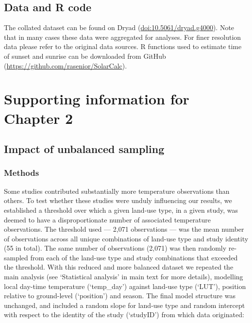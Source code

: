 \documentclass[12pt,a4paper,]{report}
\theoremstyle{definition}
\theoremstyle{definition}
\theoremstyle{definition}
\theoremstyle{remark}
\begin{document}
\section{Data and R code}\label{data-and-r-code}

The collated dataset can be found on Dryad
(\url{doi:10.5061/dryad.g4000}). Note that in many cases these data were
aggregated for analyses. For finer resolution data please refer to the
original data sources. R functions used to estimate time of sunset and
sunrise can be downloaded from GitHub
(\url{https://github.com/rasenior/SolarCalc}).

\clearpage
\appendix
{} \addappheadtotoc
\setcounter{figure}{0} \makeatletter 
\renewcommand{\thefigure}{A1.\@arabic\c@figure} \makeatother

\chapter{Supporting information for Chapter
2}\label{supporting-information-for-chapter-2}

\section{Impact of unbalanced sampling}\label{text-A-1-1}

\subsection{Methods}\label{methods-1}

Some studies contributed substantially more temperature observations
than others. To test whether these studies were unduly influencing our
results, we established a threshold over which a given land-use type, in
a given study, was deemed to have a disproportionate number of
associated temperature observations. The threshold used --- 2,071
observations --- was the mean number of observations across all unique
combinations of land-use type and study identity (55 in total). The same
number of observations (2,071) was then randomly re-sampled from each of
the land-use type and study combinations that exceeded the threshold.
With this reduced and more balanced dataset we repeated the main
analysis (see `Statistical analysis' in main text for more details),
modelling local day-time temperature (`temp\_day') against land-use type
(`LUT'), position relative to ground-level (`position') and season. The
final model structure was unchanged, and included a random slope for
land-use type and random intercept with respect to the identity of the
study (`studyID') from which data originated:
\end{document}
